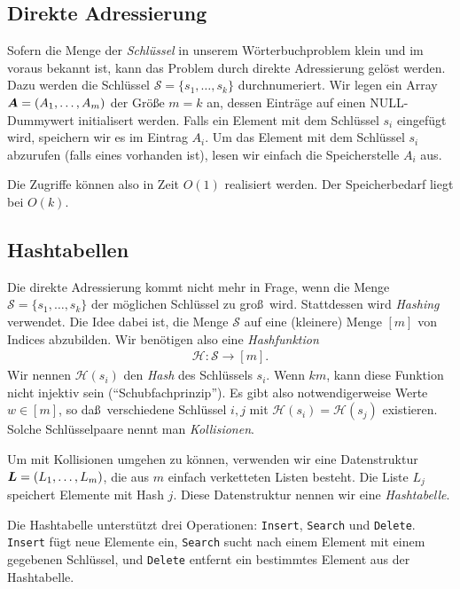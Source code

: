 \documentclass[10pt,reqno]{amsart}
\numberwithin{equation}{section}
\newcommand\cH{\mathcal H}
\newcommand\cS{\mathcal S}
\newcommand\vA{\vec A}
\newcommand\vL{\vec L}
\def\vec#1{\mathchoice{\mbox{\boldmath$\displaystyle#1$}}
{\mbox{\boldmath$\textstyle#1$}}
{\mbox{\boldmath$\scriptstyle#1$}}
{\mbox{\boldmath$\scriptscriptstyle#1$}}}
\begin{document}
\subsection{Direkte Adressierung}\label{sec_direct}
Sofern die Menge der {\em Schl\"ussel} in unserem W\"orterbuchproblem klein und im voraus bekannt ist, kann das Problem durch direkte Adressierung gel\"ost werden.
Dazu werden die Schl\"ussel $\cS=\{s_1,\ldots,s_k\}$ durchnumeriert.
Wir legen ein Array $\vA=(A_1,\ldots,A_m)$ der Gr\"o\ss e $m=k$ an, dessen Eintr\"age auf einen NULL-Dummywert initialisert werden.
Falls ein Element mit dem Schl\"ussel $s_i$ eingef\"ugt wird, speichern wir es im Eintrag $A_i$.
Um das Element mit dem Schl\"ussel $s_i$ abzurufen (falls eines vorhanden ist), lesen wir einfach die Speicherstelle $A_i$ aus.

Die Zugriffe k\"onnen also in Zeit $O(1)$ realisiert werden.
Der Speicherbedarf liegt bei $O(k)$.

\subsection{Hashtabellen}\label{sec_hashtable}
Die direkte Adressierung kommt nicht mehr in Frage, wenn die Menge $\cS=\{s_1,\ldots,s_k\}$ der m\"oglichen Schl\"ussel zu gro\ss\ wird.
Stattdessen wird {\em Hashing} verwendet.
Die Idee dabei ist, die Menge $\cS$ auf eine (kleinere) Menge $[m]$ von Indices abzubilden.
Wir ben\"otigen also eine {\em Hashfunktion}
\begin{align*}
	\cH:\cS\to[m].
\end{align*}
Wir nennen $\cH(s_i)$ den {\em Hash} des Schl\"ussels $s_i$.
Wenn $km$, kann diese Funktion nicht injektiv sein (``Schubfachprinzip'').
Es gibt also notwendigerweise Werte $w\in[m]$, so da\ss\ verschiedene Schl\"ussel $i,j$ mit $\cH(s_i)=\cH(s_j)$ existieren.
Solche Schl\"usselpaare nennt man {\em Kollisionen}.

Um mit Kollisionen umgehen zu k\"onnen, verwenden wir eine Datenstruktur $\vL=(L_1,\ldots,L_m)$, die aus $m$ einfach verketteten Listen besteht.
Die Liste $L_j$ speichert Elemente mit Hash $j$.
Diese Datenstruktur nennen wir eine {\em Hashtabelle}.

Die Hashtabelle unterst\"utzt drei Operationen: {\tt Insert}, {\tt Search} und {\tt Delete}.
{\tt Insert} f\"ugt neue Elemente ein, {\tt Search} sucht nach einem Element mit einem gegebenen Schl\"ussel, und {\tt Delete} entfernt ein bestimmtes Element aus der Hashtabelle.
\end{document}
